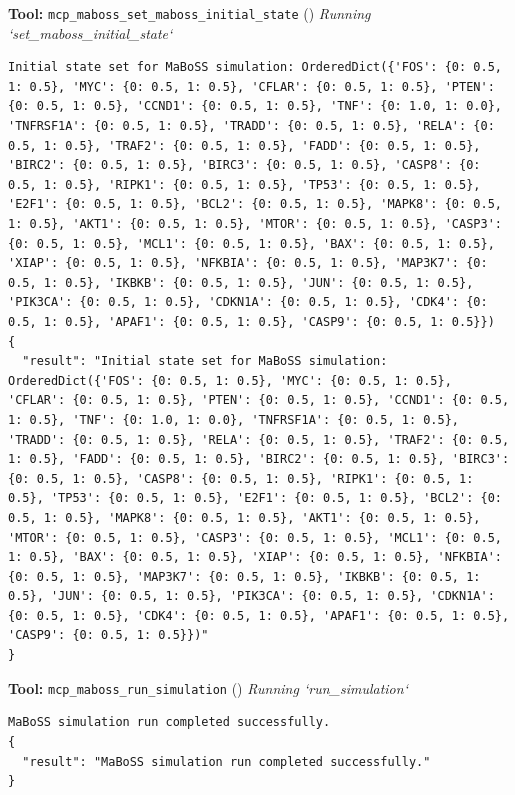 \documentclass[11pt,a4paper]{article}
\begin{document}
\begin{toolokbox}
\textbf{Tool:} \texttt{mcp\_maboss\_set\_maboss\_initial\_state} (\checkmark)
\textit{Running `set\_maboss\_initial\_state`}
\begin{lstlisting}
Initial state set for MaBoSS simulation: OrderedDict({'FOS': {0: 0.5, 1: 0.5}, 'MYC': {0: 0.5, 1: 0.5}, 'CFLAR': {0: 0.5, 1: 0.5}, 'PTEN': {0: 0.5, 1: 0.5}, 'CCND1': {0: 0.5, 1: 0.5}, 'TNF': {0: 1.0, 1: 0.0}, 'TNFRSF1A': {0: 0.5, 1: 0.5}, 'TRADD': {0: 0.5, 1: 0.5}, 'RELA': {0: 0.5, 1: 0.5}, 'TRAF2': {0: 0.5, 1: 0.5}, 'FADD': {0: 0.5, 1: 0.5}, 'BIRC2': {0: 0.5, 1: 0.5}, 'BIRC3': {0: 0.5, 1: 0.5}, 'CASP8': {0: 0.5, 1: 0.5}, 'RIPK1': {0: 0.5, 1: 0.5}, 'TP53': {0: 0.5, 1: 0.5}, 'E2F1': {0: 0.5, 1: 0.5}, 'BCL2': {0: 0.5, 1: 0.5}, 'MAPK8': {0: 0.5, 1: 0.5}, 'AKT1': {0: 0.5, 1: 0.5}, 'MTOR': {0: 0.5, 1: 0.5}, 'CASP3': {0: 0.5, 1: 0.5}, 'MCL1': {0: 0.5, 1: 0.5}, 'BAX': {0: 0.5, 1: 0.5}, 'XIAP': {0: 0.5, 1: 0.5}, 'NFKBIA': {0: 0.5, 1: 0.5}, 'MAP3K7': {0: 0.5, 1: 0.5}, 'IKBKB': {0: 0.5, 1: 0.5}, 'JUN': {0: 0.5, 1: 0.5}, 'PIK3CA': {0: 0.5, 1: 0.5}, 'CDKN1A': {0: 0.5, 1: 0.5}, 'CDK4': {0: 0.5, 1: 0.5}, 'APAF1': {0: 0.5, 1: 0.5}, 'CASP9': {0: 0.5, 1: 0.5}})
{
  "result": "Initial state set for MaBoSS simulation: OrderedDict({'FOS': {0: 0.5, 1: 0.5}, 'MYC': {0: 0.5, 1: 0.5}, 'CFLAR': {0: 0.5, 1: 0.5}, 'PTEN': {0: 0.5, 1: 0.5}, 'CCND1': {0: 0.5, 1: 0.5}, 'TNF': {0: 1.0, 1: 0.0}, 'TNFRSF1A': {0: 0.5, 1: 0.5}, 'TRADD': {0: 0.5, 1: 0.5}, 'RELA': {0: 0.5, 1: 0.5}, 'TRAF2': {0: 0.5, 1: 0.5}, 'FADD': {0: 0.5, 1: 0.5}, 'BIRC2': {0: 0.5, 1: 0.5}, 'BIRC3': {0: 0.5, 1: 0.5}, 'CASP8': {0: 0.5, 1: 0.5}, 'RIPK1': {0: 0.5, 1: 0.5}, 'TP53': {0: 0.5, 1: 0.5}, 'E2F1': {0: 0.5, 1: 0.5}, 'BCL2': {0: 0.5, 1: 0.5}, 'MAPK8': {0: 0.5, 1: 0.5}, 'AKT1': {0: 0.5, 1: 0.5}, 'MTOR': {0: 0.5, 1: 0.5}, 'CASP3': {0: 0.5, 1: 0.5}, 'MCL1': {0: 0.5, 1: 0.5}, 'BAX': {0: 0.5, 1: 0.5}, 'XIAP': {0: 0.5, 1: 0.5}, 'NFKBIA': {0: 0.5, 1: 0.5}, 'MAP3K7': {0: 0.5, 1: 0.5}, 'IKBKB': {0: 0.5, 1: 0.5}, 'JUN': {0: 0.5, 1: 0.5}, 'PIK3CA': {0: 0.5, 1: 0.5}, 'CDKN1A': {0: 0.5, 1: 0.5}, 'CDK4': {0: 0.5, 1: 0.5}, 'APAF1': {0: 0.5, 1: 0.5}, 'CASP9': {0: 0.5, 1: 0.5}})"
}
\end{lstlisting}
\end{toolokbox}
\begin{toolokbox}
\textbf{Tool:} \texttt{mcp\_maboss\_run\_simulation} (\checkmark)
\textit{Running `run\_simulation`}
\begin{lstlisting}
MaBoSS simulation run completed successfully.
{
  "result": "MaBoSS simulation run completed successfully."
}
\end{lstlisting}
\end{toolokbox}
\end{document}
